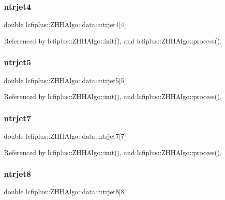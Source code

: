 \subsubsection{ntrjet4}
{\footnotesize\ttfamily double lcfiplus\+::\+Z\+H\+H\+Algo\+::data\+::ntrjet4[4]}



Referenced by lcfiplus\+::\+Z\+H\+H\+Algo\+::init(), and lcfiplus\+::\+Z\+H\+H\+Algo\+::process().

\mbox{\label{structlcfiplus_1_1ZHHAlgo_1_1data_a755cf9ffe8015d6399f07ddbdedf72e0}} 
\subsubsection{ntrjet5}
{\footnotesize\ttfamily double lcfiplus\+::\+Z\+H\+H\+Algo\+::data\+::ntrjet5[5]}



Referenced by lcfiplus\+::\+Z\+H\+H\+Algo\+::init(), and lcfiplus\+::\+Z\+H\+H\+Algo\+::process().

\mbox{\label{structlcfiplus_1_1ZHHAlgo_1_1data_a2a917c73e125436d26b07266cf979d00}} 
\subsubsection{ntrjet7}
{\footnotesize\ttfamily double lcfiplus\+::\+Z\+H\+H\+Algo\+::data\+::ntrjet7[7]}



Referenced by lcfiplus\+::\+Z\+H\+H\+Algo\+::init(), and lcfiplus\+::\+Z\+H\+H\+Algo\+::process().

\mbox{\label{structlcfiplus_1_1ZHHAlgo_1_1data_a7a61dff31f2d9b9a5f7a7c864798f374}} 
\subsubsection{ntrjet8}
{\footnotesize\ttfamily double lcfiplus\+::\+Z\+H\+H\+Algo\+::data\+::ntrjet8[8]}



